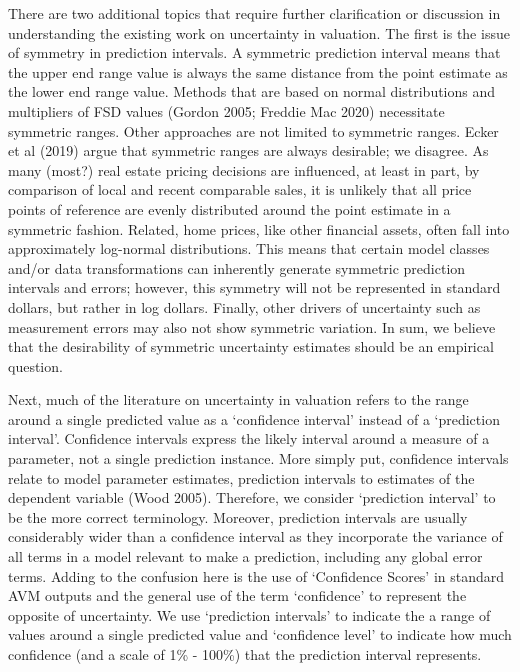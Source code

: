 \documentclass[colTwo]{anon}
\theoremstyle{definition}
\begin{document}
There are two additional topics that require further clarification or discussion in understanding the existing work on uncertainty in valuation. The first is the issue of symmetry in prediction intervals.  A symmetric prediction interval means that the upper end range value is always the same distance from the point estimate as the lower end range value.  Methods that are based on normal distributions and multipliers of FSD values (Gordon 2005; Freddie Mac 2020) necessitate symmetric ranges. Other approaches are not limited to symmetric ranges.  Ecker et al (2019) argue that symmetric ranges are always desirable; we disagree.  As many (most?) real estate pricing decisions are influenced, at least in part, by comparison of local and recent comparable sales, it is unlikely that all price points of reference are evenly distributed around the point estimate in a symmetric fashion.  Related, home prices, like other financial assets, often fall into approximately log-normal distributions.  This means that certain model classes and/or data transformations can inherently generate symmetric prediction intervals and errors; however, this symmetry will not be represented in standard dollars, but rather in log dollars. Finally, other drivers of uncertainty such as measurement errors may also not show symmetric variation.  In sum, we believe that the desirability of symmetric uncertainty estimates should be an empirical question.  

Next, much of the literature on uncertainty in valuation refers to the range around a single predicted value as a ‘confidence interval’ instead of a ‘prediction interval’.  Confidence intervals express the likely interval around a measure of a  parameter, not a single prediction instance.  More simply put, confidence intervals relate to model parameter estimates, prediction intervals to estimates of the dependent variable (Wood 2005).  Therefore, we consider ‘prediction interval’ to be the more correct terminology.  Moreover, prediction intervals are usually considerably wider than a confidence interval as they incorporate the variance of all terms in a model relevant to make a prediction, including any global error terms. Adding to the confusion here is the use of ‘Confidence Scores’ in standard AVM outputs and the general use of the term ‘confidence’ to represent the opposite of uncertainty. We use ‘prediction intervals’ to indicate the a range of values around a single predicted value and ‘confidence level’ to indicate how much confidence (and a scale of 1\% - 100\%) that the prediction interval represents.
\end{document}
